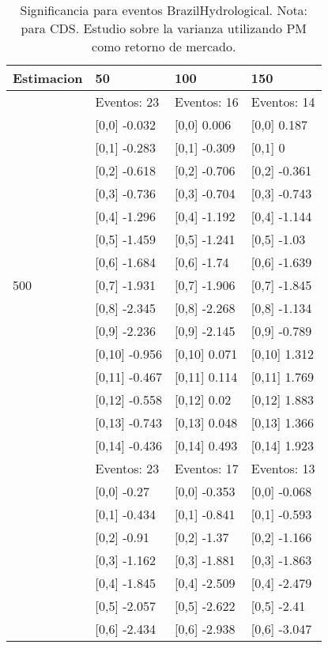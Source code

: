 \begin{table}

\caption{Significancia para eventos BrazilHydrological. Nota: para CDS. Estudio sobre la varianza utilizando PM como retorno de mercado.}
\centering
\begin{tabular}[t]{llll}
\toprule
Estimacion & 50 & 100 & 150\\
\midrule
 & Eventos:  23 & Eventos:  16 & Eventos:  14\\
 & {}[0,0] -0.032 & {}[0,0] 0.006 & {}[0,0] 0.187\\
 & {}[0,1] -0.283 & {}[0,1] -0.309 & {}[0,1] 0\\
 & {}[0,2] -0.618 & {}[0,2] -0.706 & {}[0,2] -0.361\\
 & {}[0,3] -0.736 & {}[0,3] -0.704 & {}[0,3] -0.743\\
\addlinespace
 & {}[0,4] -1.296 & {}[0,4] -1.192 & {}[0,4] -1.144\\
 & {}[0,5] -1.459 & {}[0,5] -1.241 & {}[0,5] -1.03\\
 & {}[0,6] -1.684 & {}[0,6] -1.74 & {}[0,6] -1.639\\
500 & {}[0,7] -1.931 & {}[0,7] -1.906 & {}[0,7] -1.845\\
 & {}[0,8] -2.345 & {}[0,8] -2.268 & {}[0,8] -1.134\\
\addlinespace
 & {}[0,9] -2.236 & {}[0,9] -2.145 & {}[0,9] -0.789\\
 & {}[0,10] -0.956 & {}[0,10] 0.071 & {}[0,10] 1.312\\
 & {}[0,11] -0.467 & {}[0,11] 0.114 & {}[0,11] 1.769\\
 & {}[0,12] -0.558 & {}[0,12] 0.02 & {}[0,12] 1.883\\
 & {}[0,13] -0.743 & {}[0,13] 0.048 & {}[0,13] 1.366\\
\addlinespace
 & {}[0,14] -0.436 & {}[0,14] 0.493 & {}[0,14] 1.923\\
 & Eventos:  23 & Eventos:  17 & Eventos:  13\\
 & {}[0,0] -0.27 & {}[0,0] -0.353 & {}[0,0] -0.068\\
 & {}[0,1] -0.434 & {}[0,1] -0.841 & {}[0,1] -0.593\\
 & {}[0,2] -0.91 & {}[0,2] -1.37 & {}[0,2] -1.166\\
\addlinespace
 & {}[0,3] -1.162 & {}[0,3] -1.881 & {}[0,3] -1.863\\
 & {}[0,4] -1.845 & {}[0,4] -2.509 & {}[0,4] -2.479\\
 & {}[0,5] -2.057 & {}[0,5] -2.622 & {}[0,5] -2.41\\
 & {}[0,6] -2.434 & {}[0,6] -2.938 & {}[0,6] -3.047\\

\end{tabular}
\end{table}
